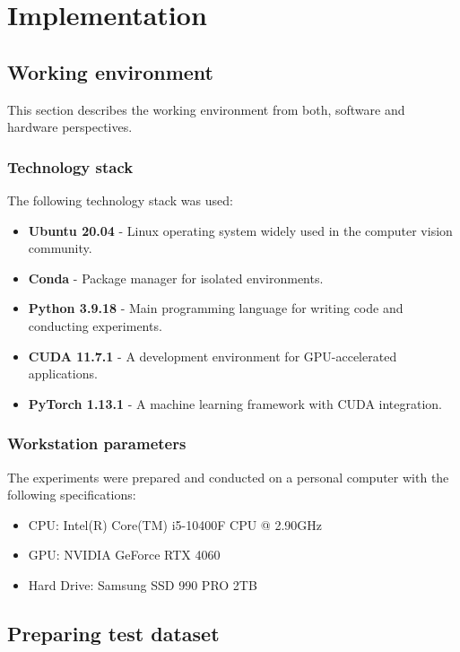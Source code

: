 
\chapter{Implementation} \label{chap:implementation}

\section{Working environment}

This section describes the working environment from both, software and hardware perspectives.

\subsection{Technology stack}

The following technology stack was used:
\begin{itemize}
  \item \textbf{Ubuntu 20.04} - Linux operating system widely used in the computer vision community. \cite{ubuntu-site}
  \item \textbf{Conda} - Package manager for isolated environments. \cite{conda-documentation}
  \item \textbf{Python 3.9.18} - Main programming language for writing code and conducting experiments. \cite{python}
  \item \textbf{CUDA 11.7.1} - A development environment for GPU-accelerated applications. \cite{cuda-toolkit}
  \item \textbf{PyTorch 1.13.1} - A machine learning framework with CUDA integration. \cite{pytorch}
\end{itemize}

\subsection{Workstation parameters}

The experiments were prepared and conducted on a personal computer with the following specifications:
\begin{itemize}
  \item CPU: Intel(R) Core(TM) i5-10400F CPU @ 2.90GHz \cite{intel-core-cpu}
  \item GPU: NVIDIA GeForce RTX 4060 \cite{nvidia-gpu}
  \item Hard Drive: Samsung SSD 990 PRO 2TB \cite{samsung-disc}
\end{itemize}

\section{Preparing test dataset}

